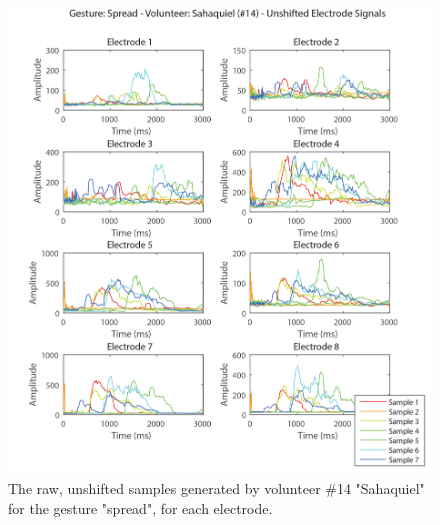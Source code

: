 \documentclass[journal]{IEEEtran}
\begin{document}
    \begin{figure}[H]
    \centering
    \includegraphics[width=1\columnwidth]{EMG/Spread_Min_Sahaquiel_Unshifted}
    \caption{The raw, unshifted samples generated by volunteer \#14 "Sahaquiel" for the gesture "spread", for each electrode.}
    \label{Spread_Min_Sahaquiel_Unshifted}
    \end{figure}
    
\end{document}
